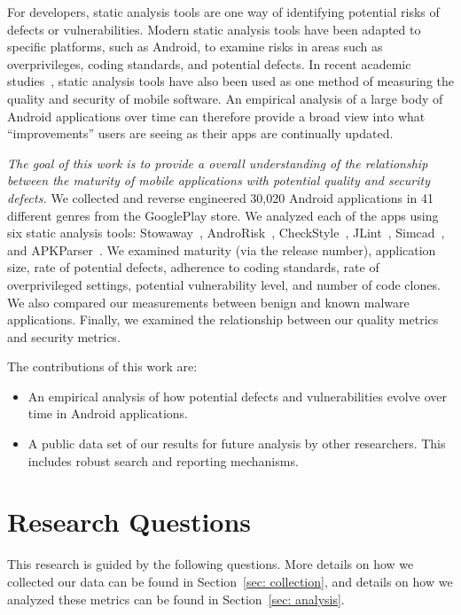 \documentclass[conference]{IEEEtran}
\begin{document}
For developers, static analysis tools are one way of identifying potential risks of defects or vulnerabilities. Modern static analysis tools have been adapted to specific platforms, such as Android, to examine risks in areas such as overprivileges, coding standards, and potential defects. In recent academic studies~\cite{Felt:2011:APD:2046707.2046779,Vidas11curbingandroid,Lee_2013}, static analysis tools have also been used as one method of measuring the quality and security of mobile software. An empirical analysis of a large body of Android applications over time can therefore provide a broad view into what ``improvements'' users are seeing as their apps are continually updated.

\emph{The goal of this work is to provide a overall understanding of the relationship between the maturity of mobile applications with potential quality and security defects.} We collected and reverse engineered 30,020 Android applications in 41 different genres from the GooglePlay store. We analyzed each of the apps using six static analysis tools: Stowaway~\cite{Felt:2011:APD:2046707.2046779}, AndroRisk~\cite{androguard_url}, CheckStyle~\cite{checkstyle_key}, JLint~\cite{jlint_key}, Simcad~\cite{6613857}, and APKParser~\cite{apkparser_link}.  We examined maturity (via the release number), application size, rate of potential defects, adherence to coding standards, rate of overprivileged settings, potential vulnerability level, and number of code clones. We also compared our measurements between benign and known malware applications. Finally, we examined the relationship between our quality metrics and security metrics.

The contributions of this work are:

\begin{itemize}
  \item An empirical analysis of how potential defects and vulnerabilities evolve over time in Android applications.
  \item A public data set of our results for future analysis by other researchers. This includes robust search and reporting mechanisms.
\end{itemize}

\section {Research Questions}
This research is guided by the following questions. More details on how we collected our data can be found in Section~\ref{sec: collection}, and details on how we analyzed these metrics can be found in Section~\ref{sec: analysis}.
\end{document}
